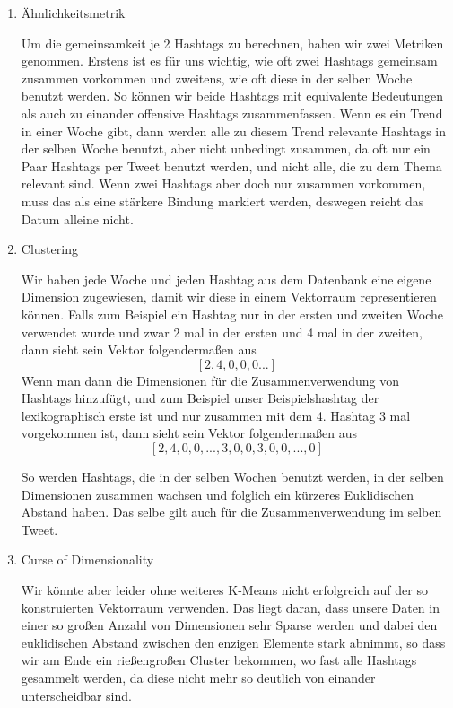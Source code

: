 \begin{enumerate}

\item Ähnlichkeitsmetrik

Um die gemeinsamkeit je 2 Hashtags zu berechnen, haben wir zwei Metriken genommen. Erstens ist es für uns wichtig, wie oft zwei Hashtags gemeinsam zusammen vorkommen und zweitens, wie oft diese in der selben Woche benutzt werden. So können wir beide Hashtags mit equivalente Bedeutungen als auch zu einander offensive Hashtags zusammenfassen. Wenn es ein Trend in einer Woche gibt, dann werden alle zu diesem Trend relevante Hashtags in der selben Woche benutzt, aber nicht unbedingt zusammen, da oft nur ein Paar Hashtags per Tweet benutzt werden, und nicht alle, die zu dem Thema relevant sind. Wenn zwei Hashtags aber doch nur zusammen vorkommen, muss das als eine stärkere Bindung markiert werden, deswegen reicht das Datum alleine nicht.

\item Clustering

Wir haben jede Woche und jeden Hashtag aus dem Datenbank eine eigene Dimension zugewiesen, damit wir diese in einem Vektorraum representieren können. Falls zum Beispiel ein Hashtag nur in der ersten und zweiten Woche verwendet wurde und zwar 2 mal in der ersten und 4 mal in der zweiten, dann sieht sein Vektor folgendermaßen aus \[[2,4,0,0,0...]\]Wenn man dann die Dimensionen für die Zusammenverwendung von Hashtags hinzufügt, und zum Beispiel unser Beispielshashtag der lexikographisch erste ist und nur zusammen mit dem 4. Hashtag 3 mal vorgekommen ist, dann sieht sein Vektor folgendermaßen aus \[[2,4,0,0,...,3,0,0,3,0,0,...,0]\]

So werden Hashtags, die in der selben Wochen benutzt werden, in der selben Dimensionen zusammen wachsen und folglich ein kürzeres Euklidischen Abstand haben. Das selbe gilt auch für die Zusammenverwendung im selben Tweet.

\item Curse of Dimensionality

Wir könnte aber leider ohne weiteres K-Means nicht erfolgreich auf der so konstruierten Vektorraum verwenden. Das liegt daran, dass unsere Daten in einer so großen Anzahl von Dimensionen sehr Sparse werden und dabei den euklidischen Abstand zwischen den enzigen Elemente stark abnimmt, so dass wir am Ende ein rießengroßen Cluster bekommen, wo fast alle Hashtags gesammelt werden, da diese nicht mehr so deutlich von einander unterscheidbar sind.


\end{enumerate}
